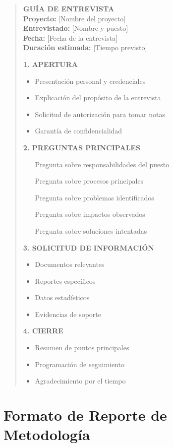 \documentclass[12pt,letterpaper,oneside]{book}
\begin{document}
\begin{quote}
\textbf{GUÍA DE ENTREVISTA}\\
\textbf{Proyecto:} [Nombre del proyecto]\\
\textbf{Entrevistado:} [Nombre y puesto]\\
\textbf{Fecha:} [Fecha de la entrevista]\\
\textbf{Duración estimada:} [Tiempo previsto]

\textbf{1. APERTURA}
\begin{itemize}
\item Presentación personal y credenciales
\item Explicación del propósito de la entrevista
\item Solicitud de autorización para tomar notas
\item Garantía de confidencialidad
\end{itemize}

\textbf{2. PREGUNTAS PRINCIPALES}
\begin{enumerate}
\item [Pregunta sobre responsabilidades del puesto]
\item [Pregunta sobre procesos principales]
\item [Pregunta sobre problemas identificados]
\item [Pregunta sobre impactos observados]
\item [Pregunta sobre soluciones intentadas]
\end{enumerate}

\textbf{3. SOLICITUD DE INFORMACIÓN}
\begin{itemize}
\item Documentos relevantes
\item Reportes específicos
\item Datos estadísticos
\item Evidencias de soporte
\end{itemize}

\textbf{4. CIERRE}
\begin{itemize}
\item Resumen de puntos principales
\item Programación de seguimiento
\item Agradecimiento por el tiempo
\end{itemize}
\end{quote}

\section{Formato de Reporte de Metodología}
\end{document}
